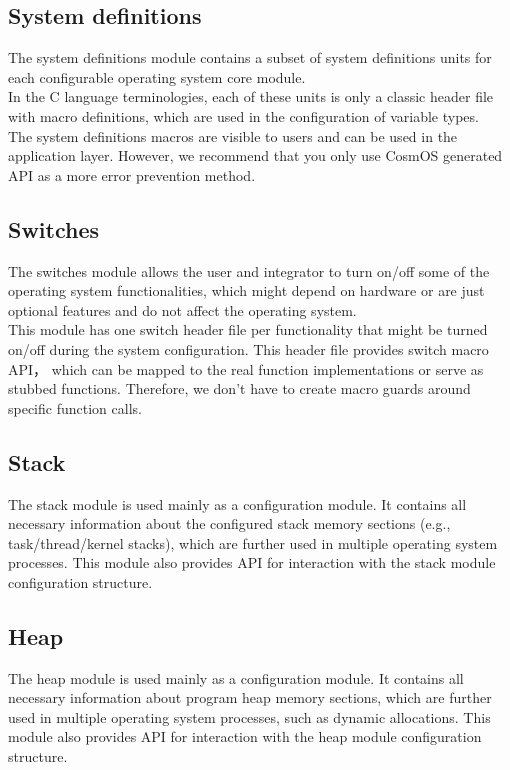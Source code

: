 \subsection{System definitions}
The system definitions module contains a subset of system definitions units for each configurable operating system core module.\\
\indent In the C language terminologies, each of these units is only a classic header file with macro definitions, which are used in the configuration of variable types.\\
\indent The system definitions macros are visible to users and can be used in the application layer. However, we recommend that you only use CosmOS generated \ac{API} as a more error prevention method.

\subsection{Switches}\label{switchModule}
The switches module allows the user and integrator to turn on/off some of the operating system functionalities, which might depend on hardware or are just optional features and do not affect the operating system. \\
\indent This module has one switch header file per functionality that might be turned on/off during the system configuration. This header file provides switch macro \ac{API}， which can be mapped to the real function implementations or serve as stubbed functions. Therefore, we don't have to create macro guards around specific function calls.

\subsection{Stack}
The stack module is used mainly as a configuration module. It contains all necessary information about the configured stack memory sections (e.g., task/thread/kernel stacks), which are further used in multiple operating system processes. This module also provides \ac{API} for interaction with the stack module configuration structure.

\subsection{Heap}
The heap module is used mainly as a configuration module. It contains all necessary information about program heap memory sections, which are further used in multiple operating system processes, such as dynamic allocations. This module also provides \ac{API} for interaction with the heap module configuration structure.

